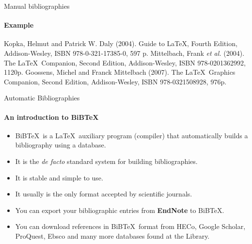 \begin{frame}[fragile,c]{Manual bibliographies}
	\framesubtitle{Example}
\begin{codesource}
	\begin{thebibliography}{99}		
			Kopka, Helmut and Patrick W. Daly (2004).
			\newblock Guide to \LaTeX, Fourth Edition,
			\newblock Addison-Wesley,
			\newblock ISBN 978-0-321-17385-0, 597 p.
			Mittelbach, Frank \emph{et al.} (2004).
			\newblock The \LaTeX\ Companion, Second Edition,
			\newblock Addison-Wesley,
			\newblock ISBN 978-0201362992, 1120p.
			Goossens, Michel and Franck Mittelbach (2007).
			\newblock The \LaTeX\ Graphics Companion, Second Edition,
			\newblock Addison-Wesley,
			\newblock ISBN 978-0321508928, 976p.
	\end{thebibliography}
\end{codesource}
\end{frame}

\begin{frame}[c]{Automatic Bibliographies}
	\framesubtitle{An introduction to BiB\TeX}
	
	\begin{itemize}
		\item BiB\TeX\ is a \LaTeX\ auxiliary program (compiler) that automatically builds a bibliography using a database.
		\item It is the \emph{de facto} standard system for building bibliographies.
		\item It is stable and simple to use.
		\item It usually is the only format accepted by scientific journals.
		\item You can export your bibliographic entries from \textbf{EndNote} to BiB\TeX.
		\item You can download references in BiB\TeX\ format from HECo, Google Scholar,
			ProQuest, Ebsco and many more databases found at the Library.
	\end{itemize}
\end{frame}

